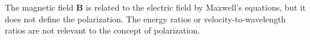 The magnetic field \(\mathbf{B}\) is related to the electric field by Maxwell's equations, but it does not define the polarization. The energy ratios or velocity-to-wavelength ratios are not relevant to the concept of polarization.

